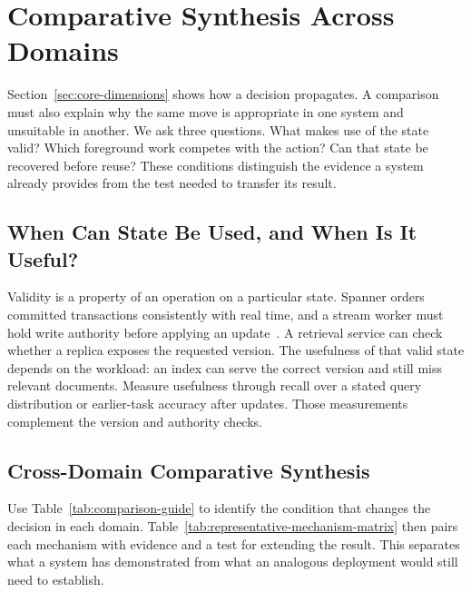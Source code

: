 \documentclass[manuscript]{acmart}
\begin{document}
\section{Comparative Synthesis Across Domains}
\label{sec:comparative-synthesis}

Section~\ref{sec:core-dimensions} shows how a decision propagates. A comparison must also explain why the same move is appropriate in one system and unsuitable in another. We ask three questions. What makes use of the state valid? Which foreground work competes with the action? Can that state be recovered before reuse? These conditions distinguish the evidence a system already provides from the test needed to transfer its result.

\subsection{When Can State Be Used, and When Is It Useful?}

Validity is a property of an operation on a particular state. Spanner orders committed transactions consistently with real time, and a stream worker must hold write authority before applying an update~\cite{corbett2012spanner,nasir2019megaphone}. A retrieval service can check whether a replica exposes the requested version. The usefulness of that valid state depends on the workload: an index can serve the correct version and still miss relevant documents. Measure usefulness through recall over a stated query distribution or earlier-task accuracy after updates. Those measurements complement the version and authority checks.

\subsection{Cross-Domain Comparative Synthesis}

Use Table~\ref{tab:comparison-guide} to identify the condition that changes the decision in each domain. Table~\ref{tab:representative-mechanism-matrix} then pairs each mechanism with evidence and a test for extending the result. This separates what a system has demonstrated from what an analogous deployment would still need to establish.
\end{document}
